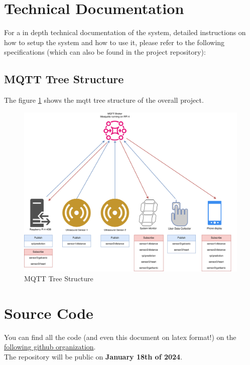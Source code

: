 \documentclass{article}
\begin{document}
\newpage
\section{Technical Documentation}
For a in depth technical documentation of the system, detailed 
instructions on how to setup the system and how to use it, please refer to the following specifications
(which can also be found in the project repository):

\subsection{MQTT Tree Structure}
The figure \ref{figura:mqtt} shows the mqtt tree structure of the overall project.
\begin{figure}[!htbp]
    \includegraphics[scale = 0.09]{../images/mqtt-diagram.png}
    \centering
    \caption{MQTT Tree Structure}
    \label{figura:mqtt}
\end{figure}

\newpage

\newpage


\newpage
\section{Source Code}
You can find all the code (and even this document on latex format!) on the \href{https://github.com/BiometricVericationApp/biometric-verification/tree/main}{following github organization}.\\

The repository will be public on \textbf{January 18th of 2024}.
\end{document}
